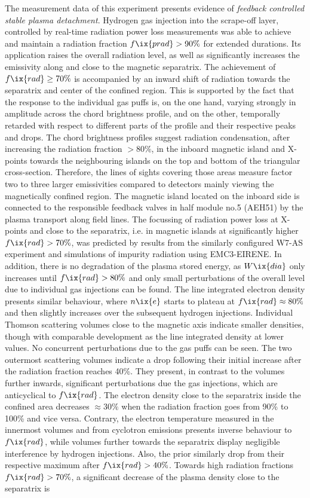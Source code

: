             The measurement data of this experiment presents evidence of \textit{feedback controlled stable plasma detachment}. Hydrogen gas injection into the scrape-off layer, controlled by real-time radiation power loss measurements was able to achieve and maintain a radiation fraction $f\ix{prad}>90\%$ for extended durations. Its application raises the overall radiation level, as well as significantly increases the emissivity along and close to the magnetic separatrix. The achievement of $f\ix{rad}\ge70\%$ is accompanied by an inward shift of radiation towards the separatrix and center of the confined region. This is supported by the fact that the response to the individual gas puffs is, on the one hand, varying strongly in amplitude across the chord brightness profile, and on the other, temporally retarded with respect to different parts of the profile and their respective peaks and drops. The chord brightness profiles suggest radiation condensation, after increasing the radiation fraction $>80\%$, in the inboard magnetic island and X-points towards the neighbouring islands on the top and bottom of the triangular cross-section. Therefore, the lines of sights covering those areas measure factor two to three larger emissivities compared to detectors mainly viewing the magnetically confined region. The magnetic island located on the inboard side is connected to the responsible feedback valves in half module no.5 (AEH51) by the plasma transport along field lines. The focussing of radiation power loss at X-points and close to the separatrix, i.e. in magnetic islands at significantly higher $f\ix{rad}>70\%$, was predicted by results from the similarly configured W7-AS experiment and simulations of impurity radiation using EMC3-EIRENE\cite{Feng2005,Thomsen2004,Feng2016}. In addition, there is no degradation of the plasma stored energy, as $W\ix{dia}$ only increases until $f\ix{rad}>80\%$ and only small perturbations of the overall level due to individual gas injections can be found. The line integrated electron density presents similar behaviour, where $n\ix{e}$ starts to plateau at $f\ix{rad}\approx80\%$ and then slightly increases over the subsequent hydrogen injections. Individual Thomson scattering volumes close to the magnetic axis indicate smaller densities, though with comparable development as the line integrated density at lower values. No concurrent perturbations due to the gas puffs can be seen. The two outermost scattering volumes indicate a drop following their initial increase after the radiation fraction reaches 40\%. They present, in contrast to the volumes further inwards, significant perturbations due the gas injections, which are anticyclical to $f\ix{rad}$. The electron density close to the separatrix inside the confined area decreases $\approx30\%$ when the radiation fraction goes from 90\% to 100\% and vice versa. Contrary, the electron temperature measured in the innermost volumes and from cyclotron emissions presents inverse behaviour to $f\ix{rad}$, while volumes further towards the separatrix display negligible interference by hydrogen injections. Also, the prior similarly drop from their respective maximum after $f\ix{rad}>40\%$. Towards high radiation fractions $f\ix{rad}>70\%$, a significant decrease of the plasma density close to the separatrix is 